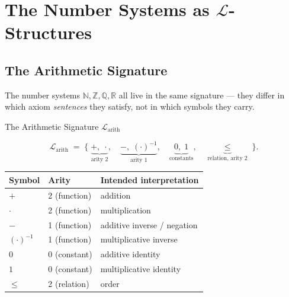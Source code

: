 %

\section{\texorpdfstring{The Number Systems as $\mathcal{L}$-Structures}{The Number Systems as L-Structures}}
\label{sec:number-systems-as-structures}

\subsection*{The Arithmetic Signature}

The number systems $\mathbb{N}, \mathbb{Z}, \mathbb{Q}, \mathbb{R}$
all live in the same signature --- they differ in which axiom
\emph{sentences} they satisfy, not in which symbols they carry.

\begin{axiombox}{The Arithmetic Signature $\mathcal{L}_{\mathrm{arith}}$}

\[
\mathcal{L}_{\mathrm{arith}}
\;=\;
\bigl\{\;
  \underbrace{+,\;\cdot}_{\text{arity 2}},\quad
  \underbrace{-,\;(\cdot)^{-1}}_{\text{arity 1}},\quad
  \underbrace{0,\;1}_{\text{constants}},\quad
  \underbrace{{\leq}}_{\text{relation, arity 2}}
\;\bigr\}.
\]

\medskip
\begin{tabular}{@{} l l l @{}}
\toprule
\textbf{Symbol} & \textbf{Arity} & \textbf{Intended interpretation} \\
\midrule
$+$        & 2 (function) & addition \\
$\cdot$    & 2 (function) & multiplication \\
$-$        & 1 (function) & additive inverse / negation \\
$(\cdot)^{-1}$ & 1 (function) & multiplicative inverse \\
$0$        & 0 (constant) & additive identity \\
$1$        & 0 (constant) & multiplicative identity \\
${\leq}$   & 2 (relation) & order \\
\bottomrule
\end{tabular}
\end{axiombox}

